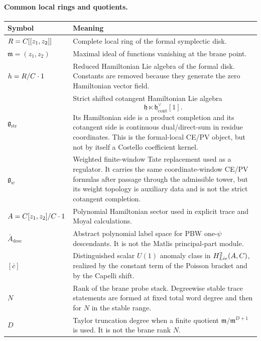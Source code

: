 \paragraph{Common local rings and quotients.}
\begin{center}
\begin{tabular}{@{}>{\raggedright\arraybackslash}p{}
  >{\raggedright\arraybackslash}p{}@{}}
\hline
\textbf{Symbol} & \textbf{Meaning}\\
\hline
\(R=C[[z_1,z_2]]\) &
Complete local ring of the formal symplectic disk.\\
\hline
\(\mathfrak m=(z_1,z_2)\) &
Maximal ideal of functions vanishing at the brane point.\\
\hline
\(h=R/C\cdot1\) &
Reduced Hamiltonian Lie algebra of the formal disk. Constants are
removed because they generate the zero Hamiltonian vector field.\\
\hline
\(\mathfrak g_{\mathrm{str}}\) &
Strict shifted cotangent Hamiltonian Lie algebra
\[
  \mathfrak h\ltimes\mathfrak h^\vee_{\mathrm{cont}}[1].
\]
Its Hamiltonian side is a product completion and its cotangent side is
continuous dual/direct-sum in residue coordinates.  This is the
formal-local CE/PV object, but not by itself a Costello coefficient
kernel.\\
\hline
\(\mathfrak g_w\) &
Weighted finite-window Tate replacement used as a regulator.  It carries
the same coordinate-window CE/PV formulas after passage through the
admissible tower, but its weight topology is auxiliary data and is not
the strict cotangent completion.\\
\hline
\(A=C[z_1,z_2]/C\cdot1\) &
Polynomial Hamiltonian sector used in explicit trace and Moyal
calculations.\\
\hline
\(\bar A_{\mathrm{desc}}\) &
Abstract polynomial label space for PBW one-\(\psi\) descendants. It
is not the Matlis principal-part module.\\
\hline
\([\bar c]\) &
Distinguished scalar \(U(1)\) anomaly class in
\(H^2_{Lie}(A,C)\), realized by the constant term of the
Poisson bracket and by the Capelli shift.\\
\hline
\(N\) &
Rank of the brane probe stack. Degreewise stable trace statements are
formed at fixed total word degree and then for \(N\) in the stable range.\\
\hline
\(D\) &
Taylor truncation degree when a finite quotient
\(\mathfrak m/\mathfrak m^{D+1}\) is used. It is not the brane rank
\(N\).\\
\hline
\end{tabular}
\end{center}

